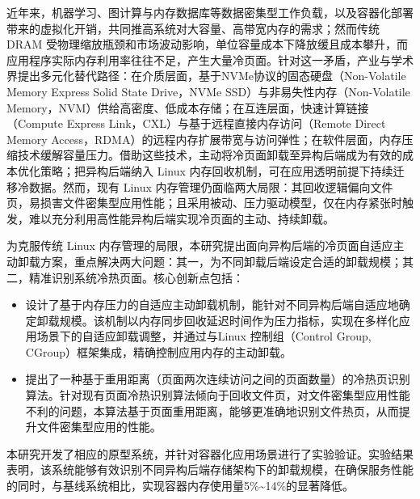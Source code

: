 
\begin{chineseabstract}

近年来，机器学习、图计算与内存数据库等数据密集型工作负载，以及容器化部署带来的虚拟化开销，共同推高系统对大容量、高带宽内存的需求；然而传统 DRAM 受物理缩放瓶颈和市场波动影响，单位容量成本下降放缓且成本攀升，而应用程序实际内存利用率往往不足，产生大量冷页面。针对这一矛盾，产业与学术界提出多元化替代路径：在介质层面，基于NVMe协议的固态硬盘（Non-Volatile Memory Express Solid State Drive，NVMe SSD）与非易失性内存（Non-Volatile Memory，NVM）供给高密度、低成本存储；在互连层面，快速计算链接（Compute Express Link，CXL）与基于远程直接内存访问（Remote Direct Memory Access，RDMA）的远程内存扩展带宽与访问弹性；在软件层面，内存压缩技术缓解容量压力。借助这些技术，主动将冷页面卸载至异构后端成为有效的成本优化策略；把异构后端纳入 Linux 内存回收机制，可在应用透明前提下持续迁移冷数据。然而，现有 Linux 内存管理仍面临两大局限：其回收逻辑偏向文件页，易损害文件密集型应用性能；且采用被动、压力驱动模型，仅在内存紧张时触发，难以充分利用高性能异构后端实现冷页面的主动、持续卸载。

为克服传统 Linux 内存管理的局限，本研究提出面向异构后端的冷页面自适应主动卸载方案，重点解决两大问题：其一，为不同卸载后端设定合适的卸载规模；其二，精准识别系统冷热页面。核心创新点包括：

\begin{itemize}
    \item 设计了基于内存压力的自适应主动卸载机制，能针对不同异构后端自适应地确定卸载规模。该机制以内存同步回收延迟时间作为压力指标，实现在多样化应用场景下的自适应卸载调整，并通过与Linux 控制组（Control Group, CGroup）框架集成，精确控制应用内存的主动卸载。
    \item 提出了一种基于重用距离（页面两次连续访问之间的页面数量）的冷热页识别算法。针对现有页面冷热识别算法倾向于回收文件页，对文件密集型应用性能不利的问题，本算法基于页面重用距离，能够更准确地识别文件热页，从而提升文件密集型应用的性能。
\end{itemize}

本研究开发了相应的原型系统，并针对容器化应用场景进行了实验验证。实验结果表明，该系统能够有效识别不同异构后端存储架构下的卸载规模，在确保服务性能的同时，与基线系统相比，实现容器内存使用量5\%\~{}14\%的显著降低。

\end{chineseabstract}